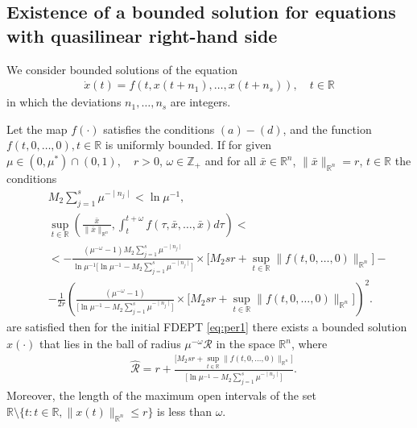 \documentclass[
11pt,%
tightenlines,%
twoside,%
onecolumn,%
nofloats,%
nobibnotes,%
nofootinbib,%
superscriptaddress,%
noshowpacs,%
centertags,aps]%
{revtex4}
\begin{document}
\subsection{Existence of a bounded solution for equations with quasilinear right-hand side}
We consider bounded solutions of the equation
\begin{eqnarray}
\dot x(t)=f\left(t,x(t+n_1),\ldots,x(t+n_s)\right),\quad t\in\mathbb R \label{eq:per1}
\end{eqnarray}
in which the deviations $n_1,\ldots,n_s$ are integers.
\begin{theorem}\label{thm3}
Let the map $f(\cdot)$ satisfies the conditions $(a)-(d)$, and the function $f(t,0,\ldots,0), t\in \mathbb R$ is uniformly bounded. If for given $\mu\in(0,\mu^*)\cap(0,1),\quad r>0$, $\omega \in \mathbb Z_+$ and for all $\bar{x}\in \mathbb R^n$, $\|\bar{x}\|_{\mathbb R^n}=r$, $t\in \mathbb R$ the conditions
\begin{eqnarray*}
&&M_2\sum_{j=1}^{s}\mu^{-\mid n_j \mid} <\ln \mu^{-1},\\
&&\sup_{t\in \mathbb R}\left(\frac{\bar{x}}{\|\bar{x}\|_{\mathbb R^n}},\int_t^{t+\omega} f(\tau,\bar{x},\ldots,\bar{x})d\tau\right)< \\
&&< - \frac{\left(\mu^{-\omega}-1 \right)M_2\sum_{j=1}^{s}\mu^{-\mid n_j \mid}}{\ln \mu^{-1}\big[\ln \mu^{-1}-M_2\sum_{j=1}^{s}\mu^{-\mid n_j \mid}\big]}\times \big[M_2 sr +\sup_{t\in \mathbb R}\|f(t,0,\ldots,0)\|_{\mathbb R^n} \big] -\\
&&-\frac{1}{2r} \left(\frac{\left(\mu^{-\omega}-1 \right)}{\big[\ln \mu^{-1}-M_2\sum_{j=1}^{s}\mu^{-\mid n_j \mid}\big]}\times \big[M_2 sr +\sup_{t\in \mathbb R}\|f(t,0,\ldots,0)\|_{\mathbb R^n} \big]\right)^2.
\end{eqnarray*}
are satisfied then for the initial FDEPT \eqref{eq:per1} there exists a bounded solution $x(\cdot)$ that lies in the ball of radius $\mu^{-\omega} \hat{\mathcal R}$ in the space $\mathbb R^n$, where
\begin{align*}
&\hat{\mathcal R}=r+\frac{\big[M_2 sr +\sup_{t\in \mathbb R}\|f(t,0,\ldots,0)\|_{\mathbb R^n} \big]}{\big[\ln \mu^{-1}-M_2\sum_{j=1}^{s}\mu^{-\mid n_j \mid}\big]}.
\end{align*}
Moreover, the length of the maximum open intervals of the set $\mathbb R\setminus \{t: {t}\in \mathbb R, \|x(t)\|_{\mathbb R^n}\leq r\}$ is less than $\omega$.
\end{theorem}
\end{document}
